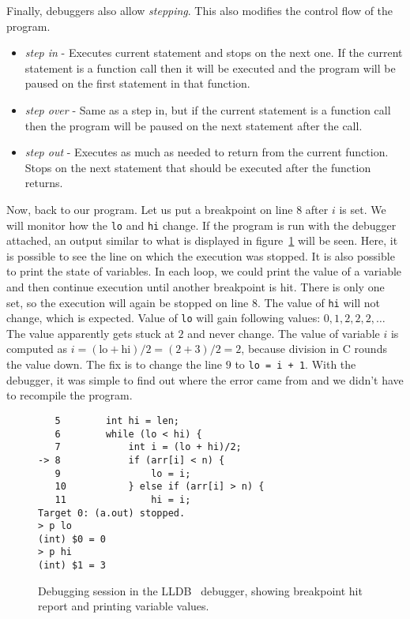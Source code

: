 Finally, debuggers also allow \textit{stepping}. This also modifies the control
flow of the program.
\begin{itemize}
    \item \textit{step in} - Executes current statement and stops on the next
        one. If the current statement is a function call then it will be
        executed and the program will be paused on the first statement in that
        function.
    \item \textit{step over} - Same as a step in, but if the current statement
        is a function call then the program will be paused on the next
        statement after the call.
    \item \textit{step out} -  Executes as much as needed to return from the
        current function. Stops on the next statement that should be executed
        after the function returns.
\end{itemize}

Now, back to our program. Let us put a breakpoint on line $8$ after $i$ is set.
We will monitor how the \texttt{lo} and \texttt{hi} change. If the program is
run with the debugger attached, an output similar to what is displayed in
figure~\ref{fig:lldb-debug1} will be seen. Here, it is possible to see the line
on which the execution was stopped. It is also possible to print the state of
variables. In each loop, we could print the value of a variable and then
continue execution until another breakpoint is hit. There is only one set, so
the execution will again be stopped on line $8$. The value of \texttt{hi} will
not change, which is expected. Value of \texttt{lo} will gain following values:
$0, 1, 2, 2, 2, \dots$ The value apparently gets stuck at $2$ and never change.
The value of variable $i$ is computed as $i = (\text{lo} + \text{hi})/2 = (2 +
3)/2 = 2$, because division in C rounds the value down. The fix is to change
the line $9$ to \texttt{lo = i + 1}. With the debugger, it was simple to find
out where the error came from and we didn't have to recompile the program.

\begin{figure}
\begin{verbatim}
   5   	    int hi = len;
   6   	    while (lo < hi) {
   7   	        int i = (lo + hi)/2;
-> 8   	        if (arr[i] < n) {
   9   	            lo = i;
   10  	        } else if (arr[i] > n) {
   11  	            hi = i;
Target 0: (a.out) stopped.
> p lo
(int) $0 = 0
> p hi
(int) $1 = 3
\end{verbatim}
    \caption{Debugging session in the LLDB~\cite{lldb} debugger, showing
    breakpoint hit report and printing variable values.}
    \label{fig:lldb-debug1}
\end{figure}

